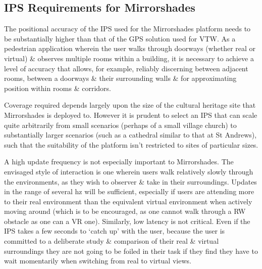 
\subsection{IPS Requirements for Mirrorshades}
The positional accuracy of the IPS used for the Mirrorshades platform needs to be substantially higher than that of the GPS solution used for VTW. As a pedestrian application wherein the user walks through doorways (whether real or virtual) \& observes multiple rooms within a building, it is necessary to achieve a level of accuracy that allows, for example, reliably discerning between adjacent rooms, between a doorways \& their surrounding walls \& for approximating position within rooms \& corridors.

Coverage required depends largely upon the size of the cultural heritage site that Mirrorshades is deployed to. However it is prudent to select an IPS that can scale quite arbitrarily from small scenarios (perhaps of a small village church) to substantially larger scenarios (such as a cathedral similar to that at St Andrews), such that the suitability of the platform isn't restricted to sites of particular sizes.

A high update frequency is not especially important to Mirrorshades. The envisaged style of interaction is one wherein users walk relatively slowly through the environments, as they wish to observer \& take in their surroundings. Updates in the range of several hz will be sufficient, especially if users are attending more to their real environment than the equivalent virtual environment when actively moving around (which is to be encouraged, as one cannot walk through a RW obstacle as one can a VR one). Similarly, low latency is not critical. Even if the IPS takes a few seconds to `catch up' with the user, because the user is committed to a deliberate study \& comparison of their real \& virtual surroundings they are not going to be foiled in their task if they find they have to wait momentarily when switching from real to virtual views.

